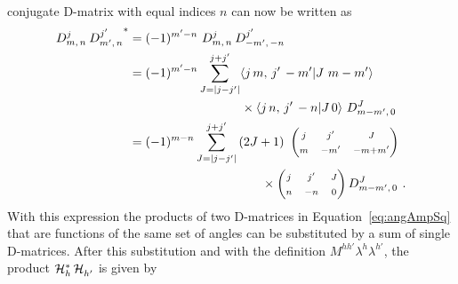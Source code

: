 conjugate D-matrix with equal indices $n$ can now be written as
\begin{equation}
  \label{eq:DDstar}
  \begin{aligned}
    \WD{j}{m}{n}{}\,\WD{j'}{m'}{n}{*}
    &= (-1)^{m'-n}\ \WD{j}{m}{n}{}\,\WD{j'}{-m'}{-n}{} \\
    &= (-1)^{m'-n} \sum_{J=|j-j'|}^{j+j'}
      \langle j\, m,\, j'\, -m' | J\ m-m' \rangle\\
      &\qquad\qquad\qquad\qquad\quad\times\langle j\,n,\,j'\,-n|J\,0 \rangle\
      \WD{J}{m-m'}{0}{} \\
    &= (-1)^{m-n} \sum_{J=|j-j'|}^{j+j'} \left(2J+1\right)\
      \begin{pmatrix}
        \mss{j} & \mss{j'} & \mss{J} \\
        \mss{m} & \mss{-m'} & \mss{-m+m'}
      \end{pmatrix}\\
      &\qquad\qquad\qquad\qquad\qquad\ \ \times
      \begin{pmatrix}
        \mss{j} & \mss{j'} & \mss{J} \\
        \mss{n} & \mss{-n} & \mss{0}
      \end{pmatrix}
      \WD{J}{m-m'}{0}{}\ .
  \end{aligned}
\end{equation}
With this expression the products of two D-matrices in Equation~\ref{eq:angAmpSq} that are functions of the same set of angles can be
substituted by a sum of single D-matrices. After this substitution and with the definition
$M^{hh'}$\textequiv$\lambda^h$\textminus$\lambda^{h'}$, the product $\angAmp[h]^*\,\angAmp[h']^{\phantom{*}}$ is given by

